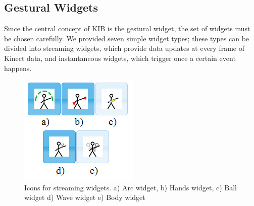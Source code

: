 \documentclass{nime-alternate}
\begin{document}
\subsection{Gestural Widgets}
Since the central concept of KIB is the gestural widget, the set of widgets must be chosen
carefully. We provided seven simple widget types; these types can be divided into streaming
widgets, which provide data updates at every frame of Kinect data, and instantaneous widgets,
which trigger once a certain event happens.
\begin{figure}
	\centering
		\includegraphics[width=0.6\columnwidth]{figures/icons.png}
	\caption{Icons for streaming widgets. a) Arc widget, b) Hands widget, c) Ball widget
    d) Wave widget e) Body widget}
	\label{fig:widgeticons}
\end{figure}
\end{document}
